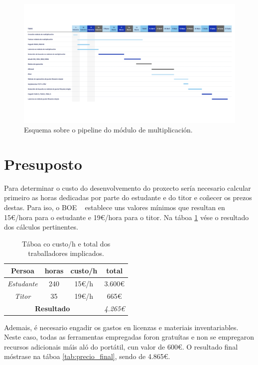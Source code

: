 \begin{figure}[hp!]
  \centering
  \includegraphics[width=\textwidth]{imaxes/Gantt - TFG.png}
  \caption{Esquema sobre o pipeline do módulo de multiplicación.}
  \label{fig:gantt}
\end{figure}

\section{Presuposto}\label{sec:presuposto}
Para determinar o custo do desenvolvemento do proxecto sería necesario calcular primeiro as horas dedicadas por parte do estudante e do titor e coñecer os prezos destas. Para iso, o BOE ~\cite{boe} establece uns valores mínimos que resultan en 15€/hora para o estudante e 19€/hora para o titor. Na táboa \ref{tab:salario} vése o resultado dos cálculos pertinentes.

\begin{table}[hp!]
    \centering
    \begin{tabular}{c|c|c|c}
    \rowcolor{udcpink!25}
    \textbf{Persoa} & \textbf{horas}  & \textbf{custo/h} & \textbf{total} 
    \\\hline
    \textit{Estudante} & 240 & 15€/h & 3.600€\\
    \textit{Titor} & 35 & 19€/h & 665€\\
    \multicolumn{3}{c|}{\textbf{Resultado}} & \textit{4.265€} \\
    \end{tabular}
    \caption{Táboa co custo/h e total dos traballadores implicados.}
    \label{tab:salario}
\end{table}

Ademais, é necesario engadir os gastos en licenzas e materiais inventariables. Neste caso, todas as ferramentas empregadas foron gratuítas e non se empregaron recursos adicionais máis aló do portátil, cun valor de 600€. O resultado final móstrase na táboa \ref{tab:precio_final}, sendo de 4.865€.

